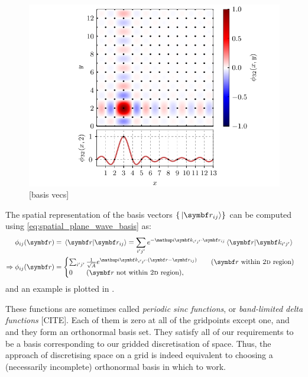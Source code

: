 \begin{figure}[t]
    \centerfloat
    \includegraphics[width=\textwidth]{figures/numerics/basis_vecs.pdf}
    \caption{[basis vecs]}
    \label{fig:basis_vecs}
\end{figure}

The spatial representation of the basis vectors $\{\ket{\vec r_{ij}}\}$ can be computed using \eqref{eq:spatial_plane_wave_basis} as:
\begin{align}
\phi_{ij}(\vec r) &= \braket{\vec r}{\vec r_{i j}} = \sum_{i^\prime j^\prime} e^{-\ii \vec k_{i^\prime j^\prime} \cdot \vec r_{i j}}\braket{\vec r}{\vec k_{i^\prime j^\prime}}\\
\Rightarrow \phi_{ij}(\vec r) &=\begin{cases}
\sum_{i^\prime j^\prime} \frac 1 {\sqrt A} e^{\ii \vec k_{i^\prime j^\prime} \cdot (\vec r - \vec r_{i j})}\qquad (\vec r\ \textrm{within \textsc{2d} region})\\
0\qquad(\vec r\ \textrm{not within \textsc{2d} region}),
\end{cases}
\end{align}
and an example is plotted in .

These functions are sometimes called \emph{periodic sinc functions}, or \emph{band-limited delta functions} [CITE]. Each of them is zero at all of the gridpoints except one, and and they form an orthonormal basis set. They satisfy all of our requirements to be a basis corresponding to our gridded discretisation of space. Thus, the approach of discretising space on a grid is indeed equivalent to choosing a (necessarily incomplete) orthonormal basis in which to work.

